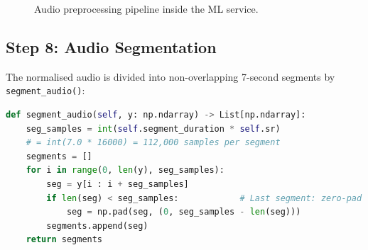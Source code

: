 \begin{figure}[h]
\centering
{}
\caption{Audio preprocessing pipeline inside the ML service.}
\label{fig:preprocess}
\end{figure}

\subsection{Step 8: Audio Segmentation}

The normalised audio is divided into non-overlapping 7-second segments by \texttt{segment\_audio()}:

\begin{lstlisting}[language=Python, caption={Segmentation (depression\_prediction.py).}]
def segment_audio(self, y: np.ndarray) -> List[np.ndarray]:
    seg_samples = int(self.segment_duration * self.sr)
    # = int(7.0 * 16000) = 112,000 samples per segment
    segments = []
    for i in range(0, len(y), seg_samples):
        seg = y[i : i + seg_samples]
        if len(seg) < seg_samples:            # Last segment: zero-pad
            seg = np.pad(seg, (0, seg_samples - len(seg)))
        segments.append(seg)
    return segments
\end{lstlisting}

